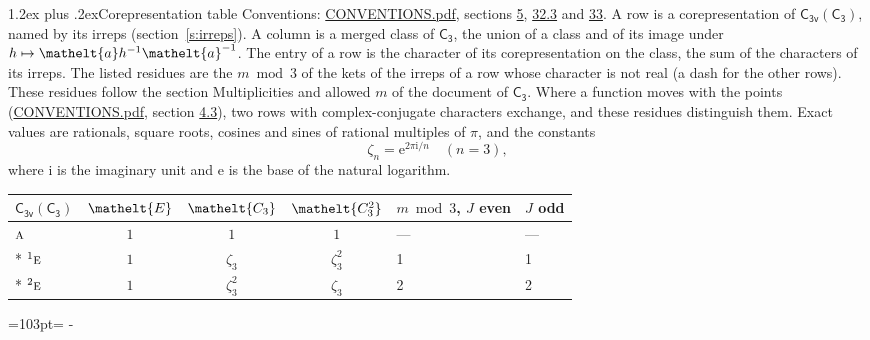 \documentclass[10pt,a4paper]{article}
\makeatletter
\renewcommand\section{\@startsection{section}{1}{\z@}{-3ex plus -1ex minus -.2ex}%
  {1.2ex plus .2ex}{\normalfont\large\sffamily\bfseries\color{parttitle}}}
\newcommand{\needspace}[1]{\par\penalty-100\begingroup\dimen0=#1\relax\dimen2=\pagegoal
  \advance\dimen2-\pagetotal\ifdim\dimen0>\dimen2\relax\ifdim\dimen2>0pt\vfil\break\fi\fi
  \endgroup}
\numberwithin{equation}{section}
\newcommand{\eltfont}[1]{{\let\sigma\eltsigma\mathelt{#1}}}
\newcommand{\grp}[1]{\mathsf{#1}}
\newcommand{\irr}[1]{\text{\normalfont\scshape #1}}
\newcommand{\conjpair}[1]{{}^{#1}}
\newcommand{\cls}[1]{\eltfont{#1}}
\newcommand{\elt}[1]{\eltfont{#1}}
\newcommand{\iunit}{\mathrm{i}}
\newcommand{\expe}{\mathrm{e}}
\newcommand{\rootunity}[1]{\zeta_{#1}}
\makeatother
\begin{document}
\section{Corepresentation table}\label{s:character_table}
Conventions: \href{../../CONVENTIONS.pdf}{CONVENTIONS.pdf}, sections \href{../../../rotation/CONVENTIONS.pdf\#conv.5}{5}, \href{../../CONVENTIONS.pdf\#conv.32.3}{32.3} and \href{../../CONVENTIONS.pdf\#conv.33}{33}.
A row is a corepresentation of $\grp{C_{3v}}(\grp{C_{3}})$, named by its irreps (section~\ref{s:irreps}). A column is a merged class of $\grp{C_{3}}$, the union of a class and of its image under $h \mapsto \elt{a} h^{-1} \elt{a}^{-1}$. The entry of a row is the character of its corepresentation on the class, the sum of the characters of its irreps.
\leavevmode\label{n:head.parity}The listed residues are the $m \bmod 3$ of the kets of the irreps of a row whose character is not real (a dash for the other rows). These residues follow the section Multiplicities and allowed $m$ of the document of \href{../../../rotation/data/pdf/C3.pdf}{$\grp{C_{3}}$}. Where a function moves with the points (\href{../../CONVENTIONS.pdf}{CONVENTIONS.pdf}, section \href{../../../rotation/CONVENTIONS.pdf\#conv.4.3}{4.3}), two rows with complex-conjugate characters exchange, and these residues distinguish them.
\leavevmode\label{n:constant.root}\label{n:index.root.order}Exact values are rationals, square roots, cosines and sines of rational multiples of $\pi$, and the constants
\begin{equation}\label{e:constants}\rootunity{n} = \expe^{2\pi\iunit/n}\quad(n = 3),\end{equation}
where $\iunit$ is the imaginary unit and $\expe$ is the base of the natural logarithm.
{\small\setlength{\tabcolsep}{4pt}\begin{longtable}{@{}lcccll@{}}\toprule
$\grp{C_{3v}}(\grp{C_{3}})$ & $\cls{E}$ & $\cls{C_{3}}$ & $\cls{C_{3}^{2}}$ & $m \bmod 3$, $J$ even & $J$ odd\\\midrule\endhead
\bottomrule\endfoot\endlastfoot
$\irr{a}$ & $1$ & $1$ & $1$ & --- & ---\\*
$\conjpair{1}\irr{e}$ & $1$ & $\rootunity{3}$ & $\rootunity{3}^{2}$ & 1 & 1\\*
$\conjpair{2}\irr{e}$ & $1$ & $\rootunity{3}^{2}$ & $\rootunity{3}$ & 2 & 2\\
\bottomrule\end{longtable}}
\needspace{103pt}
\end{document}
